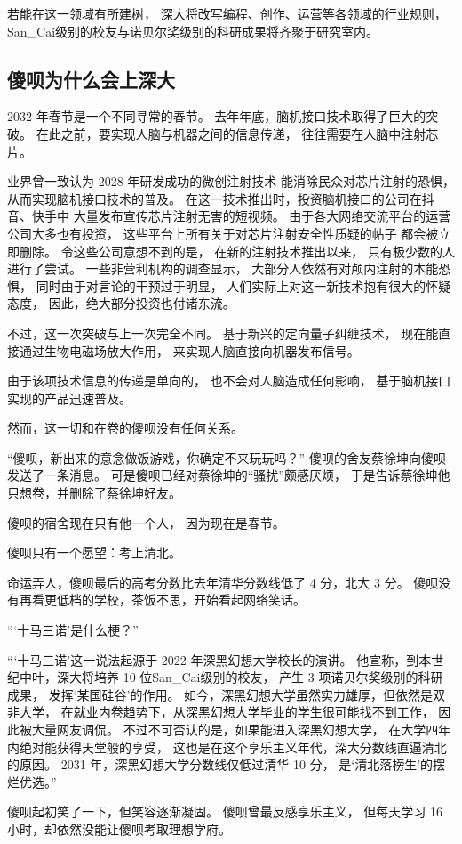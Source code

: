 \documentclass[UTF8,a4paper,11pt]{ctexart}
\newcommand{\p}{傻呗} %
\newcommand{\q}{蔡徐坤} %
\newcommand{\X}{深黑幻想大学} %
\newcommand{\x}{深大} %
\newcommand{\y}{某国} %
\newcommand{\z}{San\_Cai} %
\begin{document}
若能在这一领域有所建树，
\x 将改写编程、创作、运营等各领域的行业规则，
\z 级别的校友与诺贝尔奖级别的科研成果将齐聚于研究室内。

\subsection{\p 为什么会上\x }
2032 年春节是一个不同寻常的春节。
去年年底，脑机接口技术取得了巨大的突破。
在此之前，要实现人脑与机器之间的信息传递，
往往需要在人脑中注射芯片。

业界曾一致认为 2028 年研发成功的微创注射技术
能消除民众对芯片注射的恐惧，
从而实现脑机接口技术的普及。
在这一技术推出时，投资脑机接口的公司在抖音、快手中
大量发布宣传芯片注射无害的短视频。
由于各大网络交流平台的运营公司大多也有投资，
这些平台上所有关于对芯片注射安全性质疑的帖子
都会被立即删除。
令这些公司意想不到的是，
在新的注射技术推出以来，
只有极少数的人进行了尝试。
一些非营利机构的调查显示，
大部分人依然有对颅内注射的本能恐惧，
同时由于对言论的干预过于明显，
人们实际上对这一新技术抱有很大的怀疑态度，
因此，绝大部分投资也付诸东流。

不过，这一次突破与上一次完全不同。
基于新兴的定向量子纠缠技术，
现在能直接通过生物电磁场放大作用，
来实现人脑直接向机器发布信号。

由于该项技术信息的传递是单向的，
也不会对人脑造成任何影响，
基于脑机接口实现的产品迅速普及。

然而，这一切和在卷的\p 没有任何关系。

“\p，新出来的意念做饭游戏，你确定不来玩玩吗？”
\p 的舍友\q 向\p 发送了一条消息。
可是\p 已经对\q 的“骚扰”颇感厌烦，
于是告诉\q 他只想卷，并删除了\q 好友。

\p 的宿舍现在只有他一个人，
因为现在是春节。

\p 只有一个愿望：考上清北。

命运弄人，\p 最后的高考分数比去年清华分数线低了 4 分，北大 3 分。
\p 没有再看更低档的学校，茶饭不思，开始看起网络笑话。

“‘十马三诺’是什么梗？”

“‘十马三诺’这一说法起源于 2022 年\X 校长的演讲。
他宣称，到本世纪中叶，\x 将培养 10 位\z 级别的校友，
产生 3 项诺贝尔奖级别的科研成果，
发挥‘\y 硅谷’的作用。
如今，\X 虽然实力雄厚，但依然是双非大学，
在就业内卷趋势下，从\X 毕业的学生很可能找不到工作，
因此被大量网友调侃。
不过不可否认的是，如果能进入\X ，
在大学四年内绝对能获得天堂般的享受，
这也是在这个享乐主义年代，\x 分数线直逼清北的原因。
2031 年，\X 分数线仅低过清华 10 分，
是‘清北落榜生’的摆烂优选。”

\p 起初笑了一下，但笑容逐渐凝固。
\p 曾最反感享乐主义，
但每天学习 16 小时，却依然没能让\p 考取理想学府。
\end{document}
